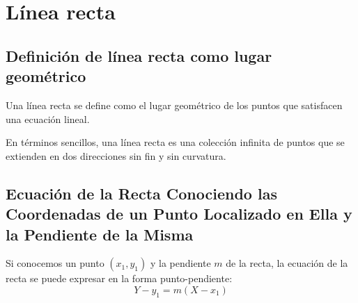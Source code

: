 \section{Línea recta} %
\subsection{Definición de línea recta como lugar geométrico}

\begin{definition}
    Una línea recta se define como el lugar geométrico de los puntos que satisfacen una ecuación lineal.
\end{definition}
En términos sencillos, una línea recta es una colección infinita de puntos que se extienden en dos direcciones sin fin y sin curvatura.
\subsection{Ecuación de la Recta Conociendo las Coordenadas de un Punto Localizado en Ella y la Pendiente de la Misma}

Si conocemos un punto \((x_1, y_1)\) y la pendiente \(m\) de la recta, la ecuación de la recta se puede expresar en la forma punto-pendiente:
\begin{equation}
    Y - y_1 = m (X - x_1)
\end{equation}

